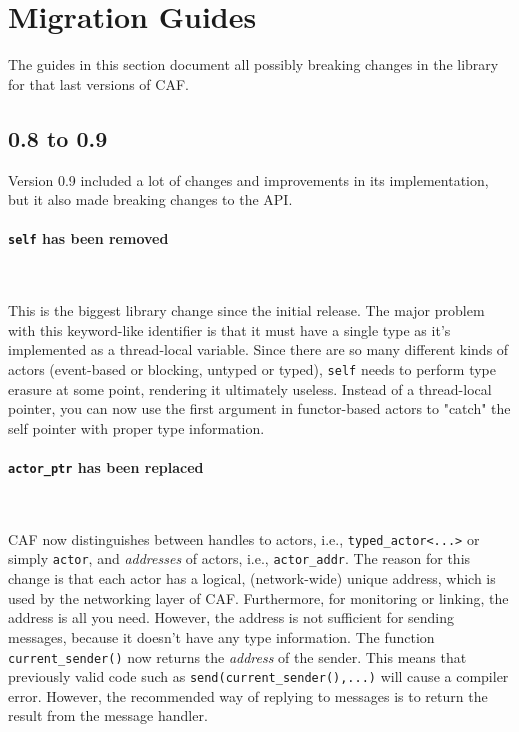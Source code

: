 \section{Migration Guides}

The guides in this section document all possibly breaking changes in the
library for that last versions of CAF.

\subsection{0.8 to 0.9}

Version 0.9 included a lot of changes and improvements in its implementation,
but it also made breaking changes to the API.

\paragraph{\lstinline^self^ has been removed}

~

This is the biggest library change since the initial release. The major problem
with this keyword-like identifier is that it must have a single type as it's
implemented as a thread-local variable. Since there are so many different kinds
of actors (event-based or blocking, untyped or typed), \lstinline^self^ needs
to perform type erasure at some point, rendering it ultimately useless. Instead
of a thread-local pointer, you can now use the first argument in functor-based
actors to "catch" the self pointer with proper type information.

\paragraph{\lstinline^actor_ptr^ has been replaced}

~

CAF now distinguishes between handles to actors, i.e.,
\lstinline^typed_actor<...>^ or simply \lstinline^actor^, and \emph{addresses}
of actors, i.e., \lstinline^actor_addr^. The reason for this change is that
each actor has a logical, (network-wide) unique address, which is used by the
networking layer of CAF. Furthermore, for monitoring or linking, the address
is all you need. However, the address is not sufficient for sending messages,
because it doesn't have any type information. The function
\lstinline^current_sender()^ now returns the \emph{address} of the sender. This
means that previously valid code such as \lstinline^send(current_sender(),...)^
will cause a compiler error. However, the recommended way of replying to
messages is to return the result from the message handler.

